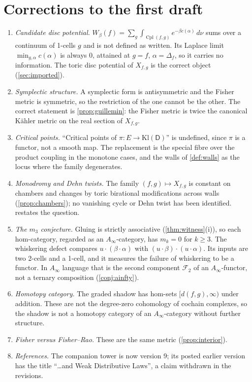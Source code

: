 \documentclass[11pt]{article}
\theoremstyle{definition}
\theoremstyle{remark}
\newcommand{\D}{\mathsf{D}}
\newcommand{\Kl}{\mathrm{Kl}}
\newcommand{\Cpl}{\operatorname{Cpl}}
\begin{document}
\section{Corrections to the first draft}\label{sec:corrections}

\begin{enumerate}[leftmargin=*]
\item \emph{Candidate disc potential.} $W_\beta(f)=\sum_g\int_{\Cpl(f,g)}e^{-\beta c(\alpha)}\,d\nu$ sums over a
  continuum of 1-cells $g$ and is not defined as written. Its Laplace limit
  $\min_{g,\alpha}c(\alpha)$ is always $0$, attained at $g=f$, $\alpha=\Delta_f$, so it carries no
  information. The toric disc potential of $X_{f,g}$ is the correct object (\cref{sec:imported}).
\item \emph{Symplectic structure.} A symplectic form is antisymmetric and the Fisher metric is
  symmetric, so the restriction of the one cannot be the other. The correct statement is
  \cref{prop:guillemin}: the Fisher metric is twice the canonical K\"ahler metric on the real section
  of $X_{f,g}$.
\item \emph{Critical points.} ``Critical points of $\pi\colon E\to\Kl(\D)$'' is undefined, since $\pi$ is a
  functor, not a smooth map. The replacement is the special fibre over the product coupling in the
  monotone cases, and the walls of \cref{def:walls} as the locus where the family degenerates.
\item \emph{Monodromy and Dehn twists.} The family $(f,g)\mapsto X_{f,g}$ is constant on chambers
  and changes by toric birational modifications across walls (\cref{prop:chambers}); no vanishing
  cycle or Dehn twist has been identified.  restates the question.
\item \emph{The $m_3$ conjecture.} Gluing is strictly associative (\cref{thm:witness}(i)), so each
  hom-category, regarded as an $A_\infty$-category, has $m_k=0$ for $k\ge3$. The whiskering defect
  compares $u\cdot(\beta\cdot\alpha)$ with $(u\cdot\beta)\cdot(u\cdot\alpha)$. Its inputs are two 2-cells and a
  1-cell, and it measures the failure of whiskering to be a functor. In $A_\infty$ language that is the
  second component $\mathcal{F}_2$ of an $A_\infty$-functor, not a ternary composition
  (\cref{conj:ainfty}).
\item \emph{Homotopy category.} The graded shadow has hom-sets $[d(f,g),\infty)$ under addition. These
  are not the degree-zero cohomology of cochain complexes, so the shadow is not a homotopy category of
  an $A_\infty$-category without further structure.
\item \emph{Fisher versus Fisher--Rao.} These are the same metric (\cref{prop:interior}).
\item \emph{References.} The companion tower is now version 9; its posted earlier version has the
  title ``\ldots and Weak Distributive Laws'', a claim withdrawn in the revisions.
\end{enumerate}
\end{document}
